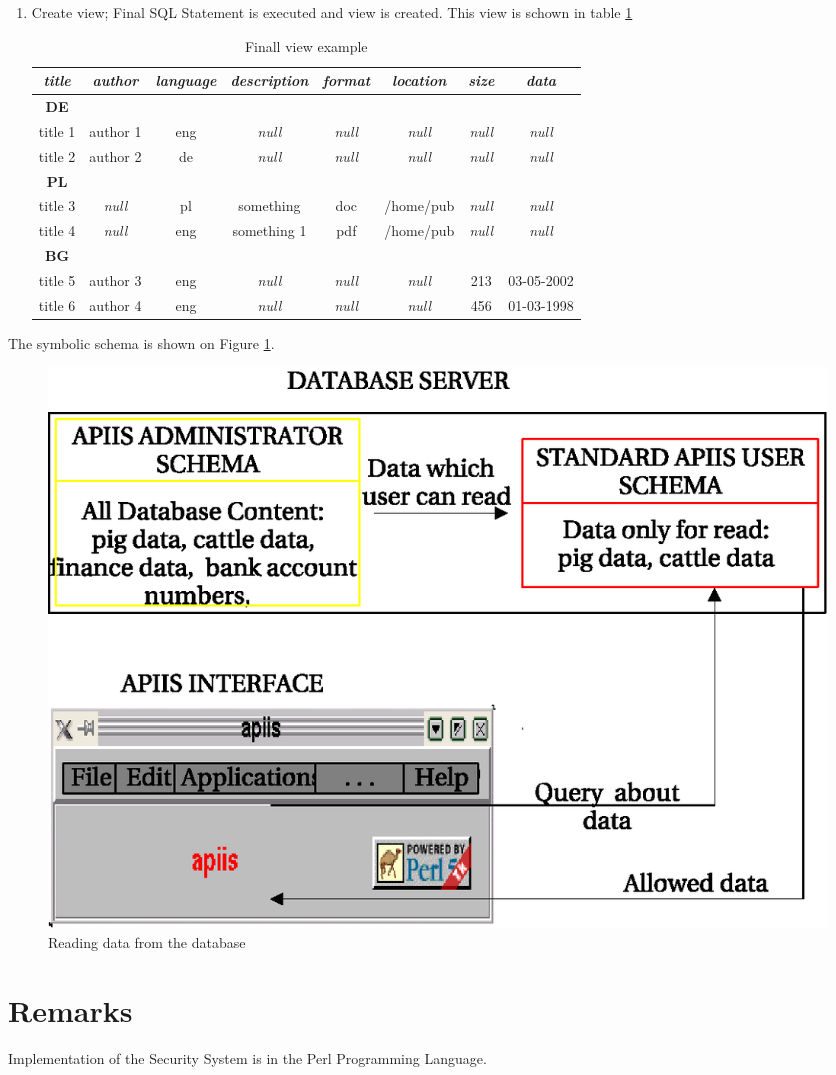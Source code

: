 \begin{enumerate}
\item Create view; Final SQL Statement is executed and view is created.
This view is schown in table \ref{userview3}

\begin{center}%
\begin{table}[h]
\begin{center}\begin{tabular}{|c|c|c|c|c|c|c|c|}
\hline 
\textbf{\emph{title}}&
\textbf{\emph{author}}&
\textbf{\emph{language}}&
\textbf{\emph{description}}&
\textbf{\emph{format}}&
\textbf{\emph{location}}&
\textbf{\emph{size}}&
\textbf{\emph{data}}\tabularnewline
\hline
\hline 
\textbf{DE}&
&
&
&
&
&
&
\tabularnewline
\hline 
title 1&
author 1&
eng&
\emph{null}&
\emph{null}&
\emph{null}&
\emph{null}&
\emph{null}\tabularnewline
\hline 
title 2&
author 2&
de&
\emph{null}&
\emph{null}&
\emph{null}&
\emph{null}&
\emph{null}\tabularnewline
\hline 
\textbf{PL}&
&
&
&
&
&
&
\tabularnewline
\hline 
title 3&
\emph{null}&
pl&
something&
doc&
/home/pub&
\emph{null}&
\emph{null}\tabularnewline
\hline 
title 4&
\emph{null}&
eng&
something 1&
pdf&
/home/pub&
\emph{null}&
\emph{null}\tabularnewline
\hline 
\textbf{BG}&
&
&
&
&
&
&
\tabularnewline
\hline 
title 5&
author 3&
eng&
\emph{null}&
\emph{null}&
\emph{null}&
213&
03-05-2002\tabularnewline
\hline 
title 6&
author 4&
eng&
\emph{null}&
\emph{null}&
\emph{null}&
456&
01-03-1998\tabularnewline
\hline
\end{tabular}\end{center}
\caption{Finall view example}\label{userview3}
\end{table}
\end{center}

\end{enumerate}

The symbolic schema is shown on Figure \ref{fig:readingdata}.
\begin{figure}[h]
\begin{center}
   \includegraphics[scale=1]{./access-control/readingdata.eps}
   \caption{Reading data from the database}
   \label{fig:readingdata}
\end{center}
\end{figure}
\section{Remarks}
Implementation of the Security System is in the Perl Programming Language. 

